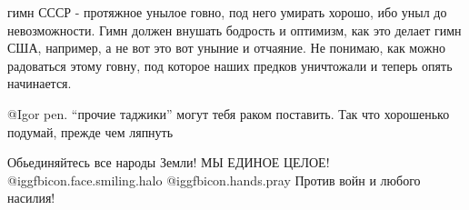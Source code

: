 \begin{itemize}
\begin{itemize}

гимн СССР - протяжное унылое говно, под него умирать хорошо, ибо уныл до
невозможности. Гимн должен внушать бодрость и оптимизм, как это делает гимн
США, например, а не вот это вот уныние и отчаяние. Не понимаю, как можно
радоваться этому говну, под которое наших предков уничтожали и теперь опять
начинается.


@Igor pen.  \enquote{прочие таджики} могут тебя раком поставить. Так что
хорошенько подумай, прежде чем ляпнуть 

\end{itemize} %

Обьединяйтесь все народы Земли! МЫ  ЕДИНОЕ ЦЕЛОЕ!
 @igg{fbicon.face.smiling.halo}  @igg{fbicon.hands.pray} 
Против войн и любого насилия! 

\end{itemize} %
